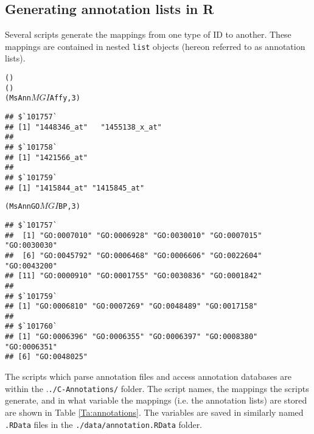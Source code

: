 \subsection{Generating annotation lists in R}

Several scripts generate the mappings from one type of 
ID to another. These mappings are contained in 
nested \texttt{list} objects (hereon referred to as annotation
lists).

\singlespacing
\begin{knitrout}
\color{fgcolor}\begin{kframe}
\begin{alltt}
()
()
(MsAnn$MGI$Affy, 3)
\end{alltt}
\begin{verbatim}
## $`101757`
## [1] "1448346_at"   "1455138_x_at"
## 
## $`101758`
## [1] "1421566_at"
## 
## $`101759`
## [1] "1415844_at" "1415845_at"
\end{verbatim}
\begin{alltt}
(MsAnnGO$MGI$BP, 3)
\end{alltt}
\begin{verbatim}
## $`101757`
##  [1] "GO:0007010" "GO:0006928" "GO:0030010" "GO:0007015" "GO:0030030"
##  [6] "GO:0045792" "GO:0006468" "GO:0006606" "GO:0022604" "GO:0043200"
## [11] "GO:0000910" "GO:0001755" "GO:0030836" "GO:0001842"
## 
## $`101759`
## [1] "GO:0006810" "GO:0007269" "GO:0048489" "GO:0017158"
## 
## $`101760`
## [1] "GO:0006396" "GO:0006355" "GO:0006397" "GO:0008380" "GO:0006351"
## [6] "GO:0048025"
\end{verbatim}
\end{kframe}
\end{knitrout}
\doublespacing

The scripts which parse annotation files and access annotation databases
are within the .\texttt{./C-Annotations/} folder. The script names, 
the mappings the scripts generate, and in what variable the mappings (i.e. the
annotation lists) are stored 
are shown in Table \ref{Ta:annotations}. The variables are saved in
similarly named \texttt{.RData} files in the
\texttt{./data/annotation.RData} folder.

